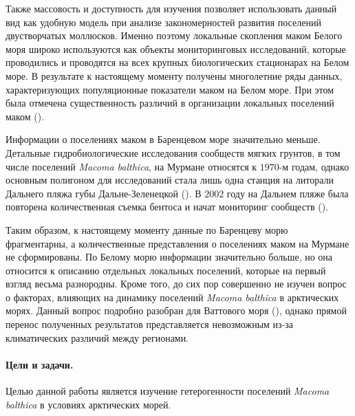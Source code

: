 Также массовость и доступность для изучения позволяет использовать данный вид как удобную модель при анализе закономерностей развития поселений двустворчатых моллюсков. 
Именно поэтому локальные скопления маком Белого моря широко используются как объекты мониторинговых исследований, которые проводились и проводятся на всех крупных биологических стационарах на Белом море. 
В результате к настоящему моменту получены многолетние ряды данных, характеризующих  популяционные показатели маком на Белом море. 
При этом была отмечена существенность различий в организации локальных поселений маком (\cite{Semenova_1974, Maximovich_Kunina_1982, Maximovich_et_al_1991, Poloskin_1996, Nikolaeva_1998, Nazarova_2003, Nazarova_Poloskin_2005}).
 
Информации о поселениях маком в Баренцевом море значительно меньше. 
Детальные гидробиологические исследования сообществ мягких грунтов, в том числе  поселений {\it Macoma balthica}, на Мурмане относятся к $1970$-м годам, однако основным полигоном для исследований стала лишь одна станция на литорали Дальнего пляжа губы Дальне-Зеленецкой (\cite{Agarova_et_al_1976}).
В $2002$ году на Дальнем пляже была повторена количественная съемка бентоса и начат мониторинг сообществ (\cite{Genelt_Dalnezeleneckaya_2008}).

Таким образом, к настоящему моменту данные по Баренцеву морю фрагментарны, а количественные представления о поселениях маком на Мурмане не сформированы. 
По Белому морю информации значительно больше, но она относится к описанию отдельных локальных поселений, которые на первый взгляд весьма разнородны. 
Кроме того, до сих пор совершенно не изучен вопрос о факторах, влияющих на динамику поселений {\it Macoma balthica} в арктических морях. 
Данный вопрос подробно разобран для Ваттового моря (\cite{Hiddink_et_al_2002_predation_epifauna, Hiddink_et_al_2002_predation_infauna, Beukema_et_al_2009}), однако прямой перенос полученных результатов представляется невозможным из-за климатических различий между регионами.


\paragraph{Цели и задачи.}
Целью данной работы является изучение гетерогенности поселений {\it Macoma balthica} в условиях арктических морей.

